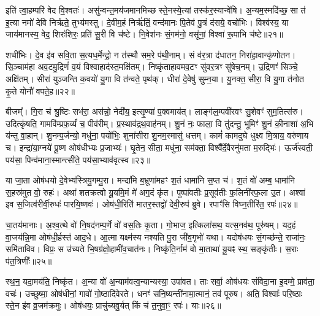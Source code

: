 इति॑ त्वा॒हम्परि॑ वेद वि॒श्वतः॑। असु॑न्वन्त॒मय॑जमानमिच्छ स्ते॒नस्ये॒त्यां तस्क॑र॒स्यान्वे॑षि। अ॒न्यम॒स्मदि॑च्छ॒ सा त॑ इ॒त्या नमो॑ देवि निर्\mbox{}ऋते॒ तुभ्य॑मस्तु। दे॒वीम॒हं निर्\mbox{}ऋ॑तिं॒ वन्द॑मानः पि॒तेव॑ पु॒त्रं द॑सये॒ वचो॑भिः। विश्व॑स्य॒ या जाय॑मानस्य॒ वेद॒ शिरः॑शिरः॒ प्रति॑ सू॒री वि च॑ष्टे। नि॒वेश॑नः सं॒गम॑नो॒ वसू॑नां॒ विश्वा॑ रू॒पाभि च॑ष्टे॥२१॥

शची॑भिः। दे॒व इ॑व सवि॒ता स॒त्यध॒र्मेन्द्रो॒ न त॑स्थौ सम॒रे प॑थी॒नाम्। सं व॑र॒त्रा द॑धातन॒ निरा॑हा॒वान्कृ॑णोतन। सि॒ञ्चाम॑हा अव॒टमु॒द्रिणं॑ व॒यं विश्वाहाद॑स्त॒मक्षि॑तम्। निष्कृ॑ताहावमव॒टꣳ सु॑वर॒त्रꣳ सु॑षेच॒नम्। उ॒द्रिणꣳ॑ सिञ्चे॒ अक्षि॑तम्। सीरा॑ युञ्जन्ति क॒वयो॑ यु॒गा वि त॑न्वते॒ पृथ॑क्। धीरा॑ दे॒वेषु॑ सुम्न॒या। यु॒नक्त॒ सीरा॒ वि यु॒गा त॑नोत कृ॒ते योनौ॑ वपते॒ह॥२२॥

बीजम्᳚। गि॒रा च॑ श्रु॒ष्टिः सभ॑रा॒ अस॑न्नो॒ नेदी॑य॒ इत्सृ॒ण्या॑ प॒क्वमाय॑त्। लाङ्ग॑ल॒म्पवी॑रवꣳ सु॒शेवꣳ॑ सुम॒तित्स॑रु। उदित्कृ॑षति॒ गामवि॑म्प्रफ॒र्व्यं॑ च॒ पीव॑रीम्। प्र॒स्थाव॑द्रथ॒वाह॑नम्। शु॒नं नः॒ फाला॒ वि तु॑दन्तु॒ भूमिꣳ॑ शु॒नं की॒नाशा॑ अ॒भि य॑न्तु वा॒हान्। शु॒नम्प॒र्जन्यो॒ मधु॑ना॒ पयो॑भिः॒ शुना॑सीरा शु॒नम॒स्मासु॑ धत्तम्। कामं॑ कामदुघे धुक्ष्व मि॒त्राय॒ वरु॑णाय च। इन्द्रा॑या॒ग्नये॑ पू॒ष्ण ओष॑धीभ्यः प्र॒जाभ्यः॑। घृ॒तेन॒ सीता॒ मधु॑ना॒ सम॑क्ता॒ विश्वै᳚र्दे॒वैरनु॑मता म॒रुद्भिः॑। ऊर्ज॑स्वती॒ पय॑सा॒ पिन्व॑माना॒स्मान्त्सी॑ते॒ पय॑सा॒भ्याव॑वृत्स्व॥२३॥

{\anuvakamend[{समो॑कसौ विश्वरूपे वि॒दुर्निर्\mbox{}ऋ॑तिर॒भि च॑ष्ट इ॒ह मि॒त्राय॒ द्वाविꣳ॑शतिश्च॥५॥}]}

या जा॒ता ओष॑धयो दे॒वेभ्य॑स्त्रियु॒गम्पु॒रा। मन्दा॑मि ब॒भ्रूणा॑महꣳ श॒तं धामा॑नि स॒प्त च॑। श॒तं वो॑ अम्ब॒ धामा॑नि स॒हस्र॑मुत वो॒ रुहः॑। अथा॑ शतक्रत्वो यू॒यमि॒मं मे॑ अग॒दं कृ॑त। पुष्पा॑वतीः प्र॒सूव॑तीः फ॒लिनी॑रफ॒ला उ॒त। अश्वा॑ इव स॒जित्व॑रीर्वी॒रुधः॑ पारयि॒ष्णवः॑। ओष॑धी॒रिति॑ मातर॒स्तद्वो॑ देवी॒रुप॑ ब्रुवे। रपाꣳ॑सि विघ्न॒तीरि॑त॒ रपः॑॥२४॥

चा॒तय॑मानाः। अ॒श्व॒त्थे वो॑ नि॒षद॑नम्प॒र्णे वो॑ वस॒तिः कृ॒ता। गो॒भाज॒ इत्किला॑सथ॒ यत्स॒नव॑थ॒ पूरु॑षम्। यद॒हं वा॒जय॑न्नि॒मा ओष॑धी॒र्\mbox{}हस्त॑ आद॒धे। आ॒त्मा यक्ष्म॑स्य नश्यति पु॒रा जी॑व॒गृभो॑ यथा। यदोष॑धयः सं॒गच्छ॑न्ते॒ राजा॑नः॒ समि॑ताविव। विप्रः॒ स उ॑च्यते भि॒षग्र॑क्षो॒हामी॑व॒चात॑नः। निष्कृ॑ति॒र्नाम॑ वो मा॒ताथा॑ यू॒यꣴ स्थ॒ सङ्कृ॑तीः। स॒राः प॑त॒त्रिणीः᳚॥२५॥

स्थ॒न॒ यदा॒मय॑ति॒ निष्कृ॑त। अ॒न्या वो॑ अ॒न्याम॑वत्व॒न्यान्यस्या॒ उपा॑वत। ताः सर्वा॒ ओष॑धयः संविदा॒ना इ॒दम्मे॒ प्राव॑ता॒ वचः॑। उच्छुष्मा॒ ओष॑धीनां॒ गावो॑ गो॒ष्ठादि॑वेरते। धनꣳ॑ सनि॒ष्यन्ती॑नामा॒त्मानं॒ तव॑ पूरुष। अति॒ विश्वाः᳚ परि॒ष्ठाः स्ते॒न इ॑व व्र॒जम॑क्रमुः। ओष॑धयः॒ प्राचु॑च्यवु॒र्यत् किं च॑ त॒नुवा॒ꣳ॒ रपः॑। याः॥२६॥

